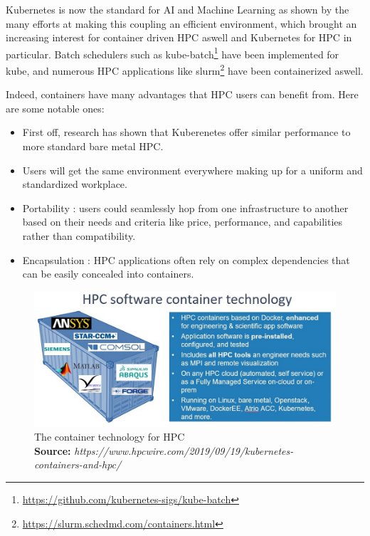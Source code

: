 \documentclass[12pt]{report}
\newcommand*{\captionsource}[2]{%
    \caption[{#1}]{%
        #1%
        \\\hspace{\linewidth}%
	\textbf{Source:} \textit{#2}%
    }%
}
\begin{document}

Kubernetes is now the standard for AI and Machine Learning as shown by the many
efforts at making this coupling an efficient
environment\cite{lee2017design}\cite{233001}\cite{10.1145/3154842.3154845},
which brought an increasing interest for container driven HPC aswell and
Kubernetes for HPC in particular. Batch schedulers such as
kube-batch\footnote{\url{https://github.com/kubernetes-sigs/kube-batch}} have
been implemented for kube, and numerous HPC applications like
slurm\footnote{\url{https://slurm.schedmd.com/containers.html}} have been
containerized aswell.

Indeed, containers have many advantages that HPC users can benefit from. Here
are some notable ones:
\begin{itemize}
	\item First off, research has shown that Kuberenetes offer similar
		performance to more standard bare metal HPC\cite{8950981}.
	\item Users will get the same environment everywhere making up for a
		uniform and standardized workplace.
	\item Portability : users could seamlessly hop from one infrastructure
		to another based on their needs and criteria like price,
		performance, and capabilities rather than compatibility.
	\item Encapsulation : HPC applications often rely on complex
		dependencies that can be easily concealed into containers.
\end{itemize}
\begin{figure}[h]
	\centering
	\includegraphics[scale=0.5]{../imgs/hpc-container.jpg}
	\captionsource{The container technology for HPC}{https://www.hpcwire.com/2019/09/19/kubernetes-containers-and-hpc/}
	\label{fig:hpc-container}
\end{figure}
\end{document}
